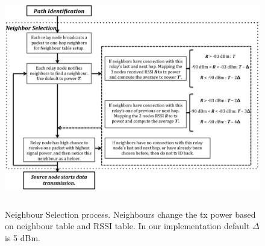\documentclass[conference]{IEEEtran}
\begin{document}
\begin{figure}[!t]
\begin{minipage}[!t]{0.73\linewidth} 
\centering
\includegraphics[height=9.5cm]{NeighborSelectionPctl2.png}
\caption{Neighbour Selection process. Neighbours change the tx power based on neighbour table and RSSI table. In our implementation default $\Delta$ is 5 dBm.}
\label{fig:NeighborSelection}
\end{minipage}
\hfill
\begin{minipage}[!t]{0.25\linewidth} 
\centering
{}
\end{minipage}
\end{figure}
\end{document}
